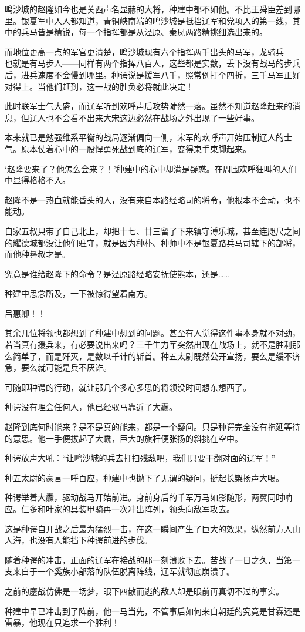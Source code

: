 鸣沙城的赵隆如今也是关西声名显赫的大将，种建中都不如他。不比王舜臣差到哪里。银夏军中人人都知道，青铜峡南端的鸣沙城是抵挡辽军和党项人的第一线，其中的兵马皆是精锐，每一个指挥都是从泾原、秦凤两路精挑细选出来的。

而地位更高一点的军官更清楚，鸣沙城现有六个指挥两千出头的马军，龙骑兵——也就是有马步人——同样有两个指挥八百人，这些都是实数，丢下没有战马的步兵后，进兵速度不会慢到哪里。种谔说是援军八千，照常例打个四折，三千马军正好对得上。当他们赶到，这一战的胜负必将就此决定！

此时联军士气大盛，而辽军听到欢呼声后攻势陡然一落。虽然不知道赵隆赶来的消息，但辽人也不会看不出来大宋这边必然在战场之外出现了一些好事。

本来就已是勉强维系平衡的战局逐渐偏向一侧，宋军的欢呼声开始压制辽人的士气。原本仗着心中的一股悍勇死战到底的辽军，变得束手束脚起来。

‘赵隆要来了？他怎么会来？！’种建中的心中却满是疑惑。在周围欢呼狂叫的人们中显得格格不入。

赵隆不是一热血就能昏头的人，没有来自本路经略司的将令，他根本不会动，也不能动。

自家五叔只带了自己北上，却把十七、廿三留了下来镇守溥乐城，甚至连咫尺之间的耀德城都没让他们驻守，就是因为种朴、种师中不是银夏路兵马司辖下的部将，而他种彝叔才是。

究竟是谁给赵隆下的命令？是泾原路经略安抚使熊本，还是……

种建中思念所及，一下被惊得望着南方。

吕惠卿！！

其余几位将领也都想到了种建中想到的问题。甚至有人觉得这件事本身就不对劲，若当真有援兵来，有必要说出来吗？三千生力军突然出现在战场上，就不是胜利那么简单了，而是歼灭，是数以千计的斩首。种五太尉既然公开宣扬，要么是缓不济急，要么就可能是兵不厌诈。

可随即种谔的行动，就让那几个多心多思的将领没时间想东想西了。

种谔没有理会任何人，他已经驭马靠近了大纛。

赵隆到底何时能来？是不是真的能来，都是一个疑问。只是种谔完全没有拖延等待的意思。他一手便拔起了大纛，巨大的旗杆便张扬的斜挑在空中。

种谔放声大吼：“让鸣沙城的兵去打扫残敌吧，我们只要干翻对面的辽军！”

种五太尉的豪言一呼百应，种建中也抛下了无谓的疑问，挺起长槊扬声大喝。

种谔举着大纛，驱动战马开始前进。身前身后的千军万马如影随形，两翼同时响应。仁多和叶家的具装甲骑再一次冲出阵列，领头向敌军攻去。

这是种谔自开战之后最为猛烈一击，在这一瞬间产生了巨大的效果，纵然前方人山人海，也没有人能挡下种谔前进的步伐。

随着种谔的冲击，正面的辽军在接战的那一刻溃败下去。苦战了一日之久，当第一支来自于一个奚族小部落的队伍脱离阵线，辽军就彻底崩溃了。

之前的鏖战仿佛是一场梦，眼下四散而逃的敌人却是眼前再真切不过的事实。

种建中早已冲击到了阵前，他一马当先，不管事后如何来自朝廷的究竟是甘霖还是雷暴，他现在只追求一个胜利！
